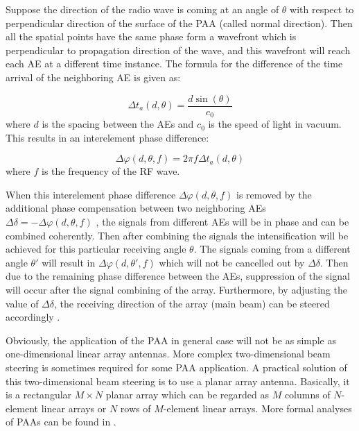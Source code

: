 Suppose the direction of the radio wave is coming at an angle of $\theta$ with respect to perpendicular direction of the surface of the PAA (called normal direction). Then all the spatial points have the same phase form a wavefront which is perpendicular to propagation direction of the wave, and this wavefront will reach each AE at a different time instance. The formula for the difference of the time arrival of the neighboring AE is given as:

\begin{equation}\label{eq:time_delay}
	\Delta t_a(d,\theta)=\frac{d \sin(\theta)}{c_0}
\end{equation}
where $d$ is the spacing between the AEs and $c_0$ is the speed of light in vacuum. This results in an interelement phase difference:

\begin{equation}\label{eq:phase_diff}
	\Delta \varphi (d,\theta,f)=2\pi f \Delta t_a(d,\theta)
\end{equation}
where $f$ is the frequency of the \ac{RF} wave.

When this interelement phase difference $\Delta \varphi (d,\theta,f)$ is removed by the additional phase compensation between two neighboring AEs $\Delta \delta = -\Delta \varphi (d,\theta,f)$ , the signals from different AEs will be in
phase and can be combined coherently. Then after combining the signals the intensification will be achieved for this particular receiving angle $\theta$. The signals coming from a different angle $\theta '$ will result in $\Delta \varphi (d,\theta ',f)$ which will not be cancelled out by $\Delta \delta$. Then due to the remaining phase difference between the AEs,
suppression of the signal will occur after the signal combining of the array. Furthermore, by adjusting the value of $\Delta \delta$, the receiving direction of the array (main beam) can be steered accordingly \citep{zhuang2010ring}.

Obviously, the application of the PAA in general case will not be as simple as one-dimensional linear array antennas. More complex two-dimensional beam steering is sometimes required for some PAA application. A practical solution of this two-dimensional beam steering is to use a planar array antenna. Basically, it is a rectangular $M\times N$ planar array which can be regarded as $M$ columns of $N$-element linear arrays or $N$ rows of $M$-element linear arrays. More formal analyses of PAAs can be
found in \citep{cheng1989field,balanis2008modern}.

